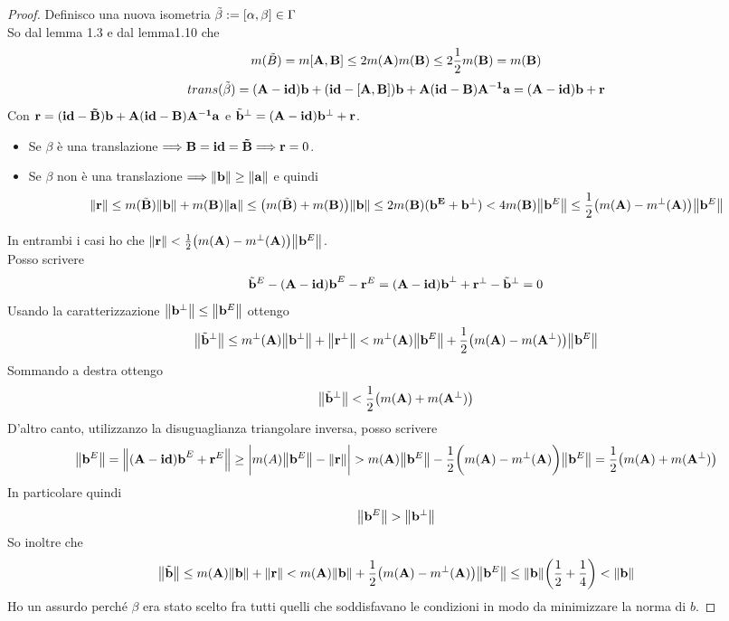 \documentclass[12pt,a4paper]{book}
\begin{document}
\begin{proof}
\begin{minipage}{0.5\textwidth}
\end{minipage}
Definisco una nuova isometria $ \tilde{\beta} := [\vb{\alpha,\beta}] \in \Gamma$  \\
So dal lemma 1.3 e dal lemma1.10 che
\[ m(\tilde{B} ) = m[\vb{A,B}] \leq 2m(\vb{A}) m(\vb{B}) \leq 2 \frac{1}{2}m(\vb{B}) = m(\vb{B}) \]
\[ trans( \tilde{\beta}) = \vb{(A-id)b + (id-[A,B])b + A(id-B)A^{-1}a} = \vb{(A-id)b + r}\]
Con $\vb{r} = \vb{(id-\tilde{B})b + A(id-B)A^{-1}a}$ e $\tilde{\vb{b}}^{\perp} =  \vb{(A-id)b^{\perp} + r}$.
\begin{itemize}
\item Se $\beta$  è una translazione $\Longrightarrow \vb{B = id = \tilde{B}} \Longrightarrow \vb{r} = 0$. 
\item Se $\beta$ non è una translazione $\Longrightarrow \norm{\vb{b}} \geq \norm{\vb{a}}$  e quindi \\
\[ \norm{\vb{r}} \leq m(\tilde{\vb{B}}) \norm{\vb{b}} + m(\vb{B}) \norm{\vb{a}} \leq \big( m(\tilde{\vb{B}}) + m(\vb{B}) \big) \norm{\vb{b}} \leq 2m(\vb{B})(\vb{b^{E}+ b^{\perp}}) < 4 m(\vb{B}) \norm{\vb{b}^{E}} \leq \frac{1}{2} \big( m(\vb{A}) - m^{\perp}(\vb{A}) \big)\norm{\vb{b}^{E}} \]
\end{itemize}
In entrambi i casi ho che $\norm{\vb{r}} < \frac{1}{2} \big( m(\vb{A}) - m^{\perp}(\vb{A}) \big)\norm{\vb{b}^{E}}$. \\
Posso scrivere 
\[ \tilde{\vb{b}}^{E} -(\vb{A-id) b}^{E} - \vb{r}^{E} = (\vb{A-id) b}^{\perp} + \vb{r}^{\perp} - \tilde{\vb{b}}^{\perp} = 0 \]
Usando la caratterizzazione $\norm{\vb{b}^{\perp}} \leq \norm{\vb{b}^E}$  ottengo
\[ \norm{\tilde{\vb{b}}^{\perp}} \leq  m^{\perp}(\vb{A}) \norm{\vb{b}^{\perp}} + \norm{\vb{r}^{\perp}} < m^{\perp}(\vb{A}) \norm{\vb{b}^{E}} + \frac{1}{2} \big( m(\vb{A}) - m(\vb{A}^{\perp}) \big)\norm{\vb{b}^{E}}  \] 
Sommando a destra ottengo
\[ \norm{\tilde{\vb{b}}^{\perp}} < \frac{1}{2} \big( m(\vb{A}) + m(\vb{A}^{\perp}) \big) \]
D'altro canto, utilizzanzo la disuguaglianza triangolare inversa, posso scrivere
\[ \norm{\vb{b}^{E}} = \norm{(\vb{A-id) b}^{E} + \vb{r}^{E}} \geq \bigg| m(A) \norm{\vb{b}^E} - \norm{\vb{r}}\bigg| > m(\vb{A}) \norm{\vb{b}^E} - \frac{1}{2} \bigg( m(\vb{A}) - m^{\perp}(\vb{A})\bigg)\norm{\vb{b}^E} =  \frac{1}{2} \big( m(\vb{A}) + m(\vb{A}^{\perp}) \big)\]
In particolare quindi 
\[ \norm{\vb{b}^{E}} > \norm{\vb{b}^{\perp}}\]
So inoltre che 
\[ \norm{\tilde{\vb{b}}} \leq m(\vb{A}) \norm{\vb{b}} + \norm{\vb{r}} < m(\vb{A})\norm{\vb{b}} + \frac{1}{2} \big( m(\vb{A}) - m^{\perp}(\vb{A}) \big)\norm{\vb{b}^{E}} \leq  \norm{\vb{b}} \bigg( \frac{1}{2} + \frac{1}{4}\bigg) < \norm{\vb{b}} \]
Ho un assurdo perché $\beta$ era stato scelto fra tutti quelli che soddisfavano le condizioni in modo da minimizzare la norma di $b$.


\end{proof}
\end{document}
